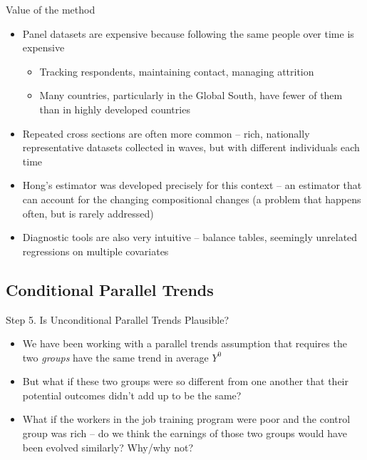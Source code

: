 \documentclass{beamer}
\begin{document}
\begin{frame}{Value of the method}

\begin{itemize}
\item Panel datasets are expensive because following the same people over time is expensive
	\begin{itemize}
	\item Tracking respondents, maintaining contact, managing attrition
	\item Many countries, particularly in the Global South, have fewer of them than in highly developed countries
	\end{itemize}
\item Repeated cross sections are often more common -- rich, nationally representative datasets collected in waves, but with different individuals each time
\item Hong's estimator was developed precisely for this context -- an estimator that can account for the changing compositional changes (a problem that happens often, but is rarely addressed)
\item Diagnostic tools are also very intuitive -- balance tables, seemingly unrelated regressions on multiple covariates

\end{itemize}

\end{frame}






\subsection{Conditional Parallel Trends}

\begin{frame}{Step 5. Is Unconditional Parallel Trends Plausible?}

\begin{itemize}

\item We have been working with a parallel trends assumption that requires the two \emph{groups} have the same trend in average $Y^0$

\item But what if these two groups were so different from one another that their potential outcomes didn't add up to be the same?

\item What if the workers in the job training program were poor and the control group was rich -- do we think the earnings of those two groups would have been evolved similarly?  Why/why not?



\end{itemize}

\end{frame}
\end{document}
